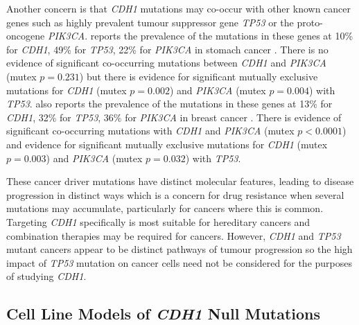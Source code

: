 Another concern is that \textit{CDH1} \glspl{mutation} may co-occur with other known cancer  genes such as highly prevalent \gls{tumour suppressor} gene \textit{\textit{TP53}} or the proto-oncogene \textit{\textit{PIK3CA}}. \citet{cBioPortal} reports the prevalence of the \glspl{mutation} in these genes at 10\% for \textit{CDH1}, 49\% for \textit{\textit{TP53}}, 22\% for \textit{\textit{PIK3CA}} in stomach cancer \citep[393 samples]{TCGA2017prov}. There is no evidence of significant co-occurring \glspl{mutation} between \textit{CDH1} and \textit{\textit{PIK3CA}} (mutex $p=0.231$) but there is evidence for significant mutually exclusive \glspl{mutation} for \textit{CDH1} (mutex $p=0.002$) and \textit{\textit{PIK3CA}} (mutex $p=0.004$) with \textit{\textit{TP53}}. \citet{cBioPortal} also reports the prevalence of the \glspl{mutation} in these genes at 13\% for \textit{CDH1}, 32\% for \textit{\textit{TP53}}, 36\% for \textit{\textit{PIK3CA}} in breast cancer \citep[963 samples]{TCGA2017prov}. There is evidence of significant co-occurring \glspl{mutation} with \textit{CDH1} and \textit{\textit{PIK3CA}} (mutex $p<0.0001$) and evidence for significant mutually exclusive \glspl{mutation} for \textit{CDH1} (mutex $p=0.003$) and \textit{\textit{PIK3CA}} (mutex $p=0.032$) with \textit{\textit{TP53}}.

These cancer \glspl{driver mutation} have distinct molecular features, leading to disease progression in distinct ways which is a concern for drug resistance when several \glspl{mutation} may accumulate, particularly for  cancers where this is common. Targeting \textit{CDH1} specifically is most suitable for \gls{hereditary} cancers and combination therapies may be required for  cancers. However, \textit{CDH1} and \textit{\textit{TP53}} \gls{mutant} cancers appear to be distinct pathways of tumour progression so the high impact of \textit{\textit{TP53}} \gls{mutation} on cancer cells need not be considered for the purposes of studying \textit{CDH1}.
\fi

\subsection{Cell Line Models of \textit{CDH1} Null Mutations}
\label{HDGC_Model}

